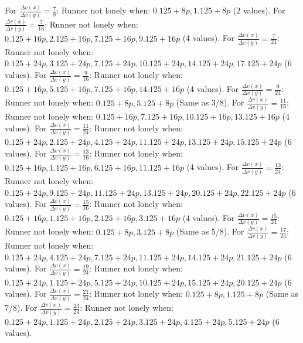 \documentclass[12pt, a4paper]{article}
\begin{document}
\newline
\newline
For $\frac{\Delta v(x)}{\Delta v(y)} =\frac{7}{8}$: Runner not lonely when: $0.125+8p, 1.125+8p$ (2 values). \newline For $\frac{\Delta v(x)}{\Delta v(y)} =\frac{7}{16}$: Runner not lonely when: $0.125+16p, 2.125+16p, 7.125+16p, 9.125+16p$ (4 values). \newline For $\frac{\Delta v(x)}{\Delta v(y)} =\frac{7}{24}$: Runner not lonely when: $0.125+24p, 3.125+24p, 7.125+24p, 10.125+24p, 14.125+24p, 17.125+24p$ (6 values).
\newline
\newline
For $\frac{\Delta v(x)}{\Delta v(y)} =\frac{9}{16}$: Runner not lonely when: $0.125+16p, 5.125+16p, 7.125+16p, 14.125+16p$ (4 values). \newline For $\frac{\Delta v(x)}{\Delta v(y)} =\frac{9}{24}$: Runner not lonely when: $0.125+8p, 5.125+8p$ (Same as 3/8).
\newline
\newline
For $\frac{\Delta v(x)}{\Delta v(y)} =\frac{11}{16}$: Runner not lonely when: $0.125+16p, 7.125+16p, 10.125+16p, 13.125+16p$ (4 values). \newline For $\frac{\Delta v(x)}{\Delta v(y)} =\frac{11}{24}$: Runner not lonely when: $0.125+24p, 2.125+24p, 4.125+24p, 11.125+24p, 13.125+24p, 15.125+24p$ (6 values).
\newline
\newline
For $\frac{\Delta v(x)}{\Delta v(y)} =\frac{13}{16}$: Runner not lonely when: $0.125+16p, 1.125+16p, 6.125+16p, 11.125+16p$ (4 values). \newline For $\frac{\Delta v(x)}{\Delta v(y)} =\frac{13}{24}$: Runner not lonely when: $0.125+24p, 9.125+24p, 11.125+24p, 13.125+24p, 20.125+24p, 22.125+24p$ (6 values).
\newline
\newline
For $\frac{\Delta v(x)}{\Delta v(y)} =\frac{15}{16}$: Runner not lonely when: $0.125+16p, 1.125+16p, 2.125+16p, 3.125+16p$ (4 values). \newline For $\frac{\Delta v(x)}{\Delta v(y)} =\frac{15}{24}$: Runner not lonely when: $0.125+8p, 3.125+8p$ (Same as 5/8).
\newline
\newline
For $\frac{\Delta v(x)}{\Delta v(y)} =\frac{17}{24}$: Runner not lonely when: $0.125+24p, 4.125+24p, 7.125+24p, 11.125+24p, 14.125+24p, 21.125+24p$ (6 values). \newline For $\frac{\Delta v(x)}{\Delta v(y)} =\frac{19}{24}$: Runner not lonely when: $0.125+24p, 1.125+24p, 5.125+24p, 10.125+24p, 15.125+24p, 20.125+24p$ (6 values). \newline For $\frac{\Delta v(x)}{\Delta v(y)} =\frac{21}{24}$: Runner not lonely when: $0.125+8p, 1.125+8p$ (Same as 7/8). \newline For $\frac{\Delta v(x)}{\Delta v(y)} =\frac{23}{24}$: Runner not lonely when: $0.125+24p, 1.125+24p, 2.125+24p, 3.125+24p, 4.125+24p, 5.125+24p$ (6 values).
\end{document}
